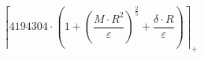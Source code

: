 \[\left\lceil 4194304 \cdot \left(1 + \left(\frac{M \cdot R^{2}}{\varepsilon}\right)^{\frac{2}{5}} + \frac{\delta \cdot R}{\varepsilon}\right) \right\rceil_{+}\]
